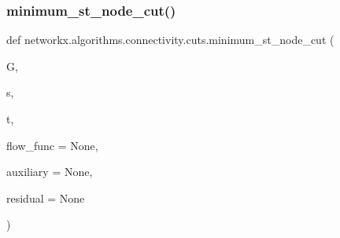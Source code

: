 \subsubsection{\texorpdfstring{minimum\+\_\+st\+\_\+node\+\_\+cut()}{minimum\_st\_node\_cut()}}
{\footnotesize\ttfamily def networkx.\+algorithms.\+connectivity.\+cuts.\+minimum\+\_\+st\+\_\+node\+\_\+cut (\begin{DoxyParamCaption}\item[{}]{G,  }\item[{}]{s,  }\item[{}]{t,  }\item[{}]{flow\+\_\+func = {\ttfamily None},  }\item[{}]{auxiliary = {\ttfamily None},  }\item[{}]{residual = {\ttfamily None} }\end{DoxyParamCaption})}

